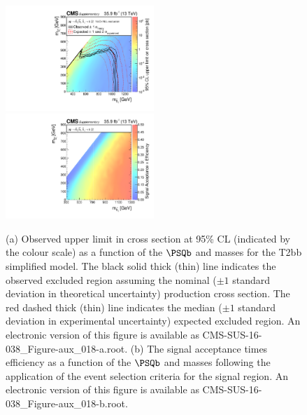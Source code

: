 \begin{figure}
    \begin{center}
            \includegraphics[width=0.50\textwidth]{Supplementary/CMS-SUS-16-038_Figure-aux_018-a}
            \includegraphics[width=0.50\textwidth]{Supplementary/CMS-SUS-16-038_Figure-aux_018-b}
        \caption{ (a) Observed upper limit in cross section at 95\% CL (indicated
        by the colour scale) as a function of 
        the $\PSQb$ and \PSGczDo %
        masses for the 
        T2bb %
        simplified  model.  The  black  solid thick  (thin)  line indicates  the
        observed  excluded  region  assuming   the  nominal  (${\pm}1$  standard
        deviation in theoretical uncertainty)  production cross section. The red
        dashed  thick  (thin)  line  indicates  the  median  (${\pm}1$  standard
        deviation in experimental uncertainty) expected excluded region.
    An electronic version of this figure is available as CMS-SUS-16-038\_Figure-aux\_018-a.root.
        (b) The signal acceptance times efficiency as a function of 
        the $\PSQb$ and \PSGczDo %
        masses following the application of the event selection criteria for the signal region.
    An electronic version of this figure is available as CMS-SUS-16-038\_Figure-aux\_018-b.root.
        }
        \label{fig:T2bb}
    \end{center}
\end{figure}

